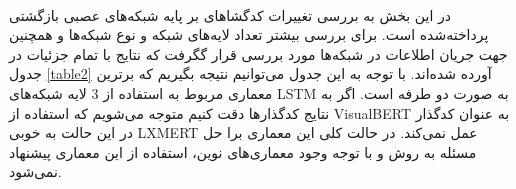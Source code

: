 \paragraph{}{
    در این بخش به بررسی تغییرات کدگشا‌های بر پایه شبکه‌های 
    عصبی بازگشتی پرداخته‌شده است. برای بررسی بیشتر تعداد لایه‌های شبکه
    و نوع شبکه‌ها و همچنین جهت جریان اطلاعات در شبکه‌ها مورد بررسی قرار گگرفت که نتایج
    با تمام جزئیات در جدول 
    \ref{table2}
    آورده شده‌اند. با توجه به این جدول می‌توانیم نتیجه بگیریم که برترین معماری
    مربوط به استفاده از 3 لایه شبکه‌های LSTM
    به صورت دو طرفه است. اگر به نتایج کدگذار‌ها دقت کنیم متوجه می‌شویم که استفاده از 
    VisualBERT
    به عنوان کدگذار در این حالت به خوبی 
    LXMERT
    عمل نمی‌کند. در حالت کلی این معماری برا حل مسئله به روش و با توجه وجود معماری‌های نوین،
    استفاده از این معماری پیشنهاد نمی‌شود. 

}

